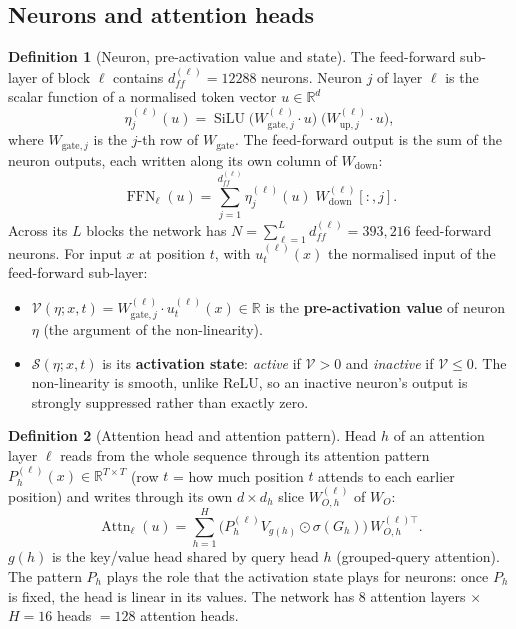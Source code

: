 \documentclass[10pt,a4paper]{article}
\newcommand{\op}[1]{\operatorname{#1}}
\theoremstyle{definition}
\newtheorem{definition}{Definition}[section]
\begin{document}
\subsection{Neurons and attention heads}
\begin{definition}[Neuron, pre-activation value and state]
The feed-forward sub-layer of block $\ell$ contains $d_{ff}^{(\ell)}=12288$ neurons. Neuron $j$ of layer $\ell$ is the scalar function of a normalised token vector $u\in\mathbb{R}^{d}$
\begin{equation}
  \eta^{(\ell)}_j(u) = \op{SiLU}\big(W^{(\ell)}_{\mathrm{gate},j}\cdot u\big)\;\big(W^{(\ell)}_{\mathrm{up},j}\cdot u\big),
\end{equation}
where $W_{\mathrm{gate},j}$ is the $j$-th row of $W_{\mathrm{gate}}$. The feed-forward output is the sum of the neuron outputs, each written along its own column of $W_{\mathrm{down}}$:
\begin{equation}
  \op{FFN}_\ell(u) = \sum_{j=1}^{d_{ff}^{(\ell)}} \eta^{(\ell)}_j(u)\;W^{(\ell)}_{\mathrm{down}}[:,j].
\end{equation}
Across its $L$ blocks the network has $N=\sum_{\ell=1}^{L} d_{ff}^{(\ell)}=393{,}216$ feed-forward neurons. For input $x$ at position $t$, with $u^{(\ell)}_t(x)$ the normalised input of the feed-forward sub-layer:
\begin{itemize}
\item $\mathcal{V}(\eta;x,t)=W^{(\ell)}_{\mathrm{gate},j}\cdot u^{(\ell)}_t(x)\in\mathbb{R}$ is the \textbf{pre-activation value} of neuron $\eta$ (the argument of the non-linearity).
\item $\mathcal{S}(\eta;x,t)$ is its \textbf{activation state}: \emph{active} if $\mathcal{V}>0$ and \emph{inactive} if $\mathcal{V}\le 0$. The non-linearity is smooth, unlike ReLU, so an inactive neuron's output is strongly suppressed rather than exactly zero.
\end{itemize}
\end{definition}
\begin{definition}[Attention head and attention pattern]
Head $h$ of an attention layer $\ell$ reads from the whole sequence through its attention pattern $P^{(\ell)}_h(x)\in\mathbb{R}^{T\times T}$ (row $t$ = how much position $t$ attends to each earlier position) and writes through its own $d\times d_h$ slice $W^{(\ell)}_{O,h}$ of $W_O$:
\begin{equation}
  \op{Attn}_\ell(u) = \sum_{h=1}^{H} \big(P^{(\ell)}_h V_{g(h)}\odot\sigma(G_h)\big)\,W^{(\ell)\top}_{O,h}.
\end{equation}
$g(h)$ is the key/value head shared by query head $h$ (grouped-query attention). The pattern $P_h$ plays the role that the activation state plays for neurons: once $P_h$ is fixed, the head is linear in its values. The network has 8 attention layers $\times$ $H=16$ heads $=128$ attention heads.
\end{definition}
\end{document}

